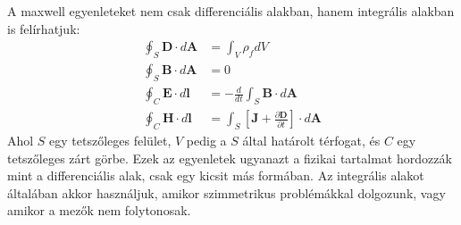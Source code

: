 \documentclass[../main.tex]{subfiles}
\begin{document}
A maxwell egyenleteket nem csak differenciális alakban, hanem integrális alakban is felírhatjuk:
\begin{equation}
    \boxed{\begin{aligned}
        \oint_S \mathbf{D} \cdot d\mathbf{A} &= \int_V \rho_f dV \\
        \oint_S \mathbf{B} \cdot d\mathbf{A} &= 0 \\
        \oint_C \mathbf{E} \cdot d\mathbf{l} &= - \frac{d}{dt} \int_S \mathbf{B} \cdot d\mathbf{A} \\
        \oint_C \mathbf{H} \cdot d\mathbf{l} &= \int_S \left[\mathbf{J} + \frac{\partial \mathbf{D}}{\partial t}\right] \cdot d\mathbf{A}
    \end{aligned}}
\end{equation}
Ahol $S$ egy tetszőleges felület, $V$ pedig a $S$ által határolt térfogat, és $C$ egy tetszőleges zárt görbe. Ezek az egyenletek ugyanazt a fizikai tartalmat hordozzák mint a differenciális alak, csak egy kicsit más formában. Az integrális alakot általában akkor használjuk, amikor szimmetrikus problémákkal dolgozunk, vagy amikor a mezők nem folytonosak.
\end{document}
